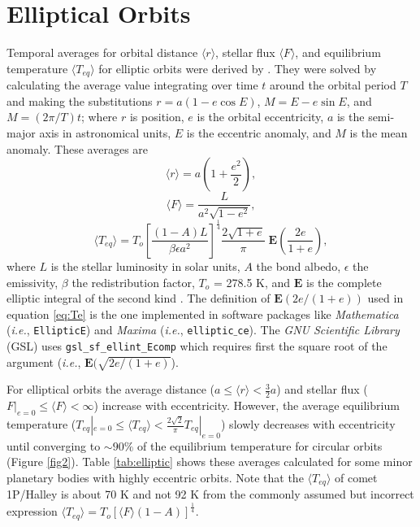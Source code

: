 \documentclass[a4paper,fleqn,usenatbib]{mnras}
\begin{document}

\section{Elliptical Orbits} \label{sec:elliptical}


Temporal averages for orbital distance $\langle r \rangle$, stellar flux $\langle F \rangle$, and equilibrium temperature $\langle T_{eq} \rangle$ for elliptic orbits were derived by \citet{2017ApJ...837L...1M}. They were solved by calculating the average value integrating over time $t$ around the orbital period $T$ and making the substitutions $r=a(1-e\cos{E})$, $M=E-e\sin{E}$, and $M=(2\pi/T)t$; where $r$ is position, $e$ is the orbital eccentricity, $a$ is the semi-major axis in astronomical units, $E$ is the eccentric anomaly, and $M$ is the mean anomaly. These averages are
\begin{equation} \label{eq:re}
\langle r \rangle = a\left ( 1+\frac{e^2}{2} \right ),
\end{equation}
\begin{equation} \label{eq:Fe}
\langle F \rangle = \frac{L}{a^2\sqrt{1-e^2}},
\end{equation}
\begin{equation} \label{eq:Te}
\langle T_{eq} \rangle = T_o\left[ \frac{(1-A)L}{\beta \epsilon a^2}\right] ^\frac{1}{4}\frac{2\sqrt{1+e}}{\pi} \; \mathbf{E}\left ( \frac{2e}{1+e} \right ),
\end{equation}
where $L$ is the stellar luminosity in solar units, $A$ the bond albedo, $\epsilon$ the emissivity, $\beta$ the redistribution factor, $T_o$ = 278.5 K, and $\mathbf{E}$ is the complete elliptic integral of the second kind \citep{MathWorld, GSL}. The definition of $\mathbf{E}(2e/(1+e))$ used in equation \ref{eq:Te} is the one implemented in software packages like \emph{Mathematica} (\emph{i.e.}, \texttt{EllipticE}) and \emph{Maxima} (\emph{i.e.}, \texttt{elliptic$\_$ce}). The \emph{GNU Scientific Library} (GSL) uses \texttt{gsl\_sf\_ellint\_Ecomp} which requires first the square root of the argument (\emph{i.e.}, $\mathbf{E}(\sqrt{2e/(1+e)}$).


For elliptical orbits the average distance ($a \leq \langle r \rangle < \frac{3}{2}a$) and stellar flux ($F|_{e=0} \leq \langle F \rangle < \infty$) increase with eccentricity. However, the average equilibrium temperature ($T_{eq}|_{e=0} \leq \langle T_{eq} \rangle < \frac{2\sqrt{2}}{\pi} T_{eq}|_{e=0}$) slowly decreases with eccentricity until converging to $\sim90\%$ of the equilibrium temperature for circular orbits (Figure  \ref{fig2}). Table \ref{tab:elliptic} shows these averages calculated for some minor planetary bodies with highly eccentric orbits. Note that the $\langle T_{eq} \rangle$ of comet 1P/Halley is about 70 K and not 92 K from the commonly assumed but incorrect expression $\langle T_{eq} \rangle = T_o [\langle F \rangle(1-A)]^\frac{1}{4}$.
\end{document}
